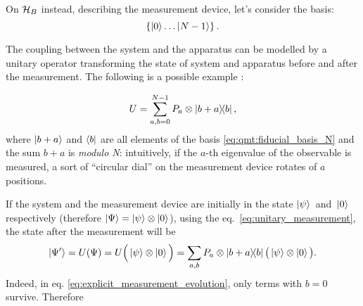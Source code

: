 On $\mathcal{H}_B$ instead, describing the measurement device, let's consider
the
basis:
\begin{equation}\label{eq:qmt:fiducial_basis_N}
  \left\{\ket{0} \dots \ket{N-1}\right\} \text{.}
\end{equation}

The coupling between the system and the apparatus
can be modelled by
a unitary operator
transforming the state of system and apparatus before and after the measurement.
The following is a possible
example \parencite[sec. 3.1.1 ``Orthogonal Measurements'']{PreskillNotes}:

\begin{equation}\label{eq:unitary_measurement}
  U = \sum_{a, b = 0}^{N-1} P_a \otimes \ketbra{b+a}{b} \text{,}
\end{equation}
where 
$\ket{b+a}$ and $\bra{b}$ are all elements of the basis \eqref{eq:qmt:fiducial_basis_N}
and
the sum $b+a$ is \emph{modulo N}:
intuitively, if the $a$-th eigenvalue of the observable is measured,
a sort of ``circular dial''
on the measurement device rotates of $a$ positions.

If the system and the measurement device are initially in the
state $\ket{\psi}$~and~$\ket{0}$ respectively
(therefore $\ket{\Psi} = \ket{\psi} \otimes \ket{0}$),
using the eq.~\eqref{eq:unitary_measurement},
the state after the measurement will be %
%
\begin{equation}\label{eq:explicit_measurement_evolution}
  \ket{\Psi^{\prime}} = U(\Psi) = U\Big(\ket{\psi} \otimes \ket{0}\Big) =
    \sum_{a, b} P_a \otimes \ketbra{b+a}{b} \big(\ket{\psi} \otimes \ket{0}\big)
    \text{.}
\end{equation}
Indeed, in eq. \eqref{eq:explicit_measurement_evolution}, only terms with $b=0$ survive.
Therefore

